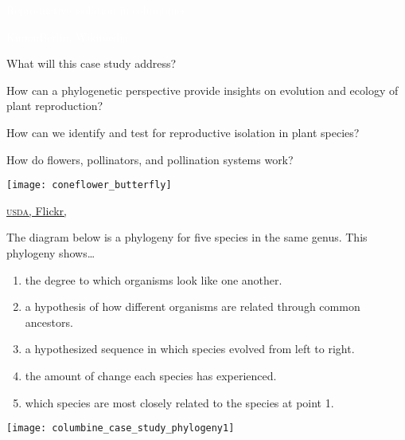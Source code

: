 \documentclass[t,handout]{beamer}  %
\newcommand{\ques}[1]{\highlight{\textsc{q#1:}}}
\begin{document}
{
\begin{frame}[t]{\textcolor{white}{Reproductive isolation in columbines.}}

\vfilll

\tiny \textcolor{white}{KimonBerlin, Wikimedia }
\end{frame}
}
%
\begin{frame}[t]{What will this case study address?}

	\begin{multicols}{2}
	\hangpara How can a phylogenetic perspective provide insights on evolution and ecology of plant reproduction?
	
	\hangpara How can we identify and test for reproductive isolation in plant species?

	\hangpara How do flowers, pollinators, and pollination systems work?

	\columnbreak
	
	\texttt{[image: coneflower\_butterfly]}
	\end{multicols}
	 
	\vfilll
	
	\hfill \tiny \href{https://www.flickr.com/photos/usdagov/12837726385/in/photolist-kyqGN6-fh8AaV-kyTDd4-i44Hma-dMyexJ-U9oNPh-8MVKpC-9iEtgR-pfUkfN-i6BB1D-WeaPsw-aqUmTV-6R2QfY-e1GG39-JdQ1fs-YNbHzz-9gp9eM-att94W-wqBjH2-ePxjLW-kyWRcE-Ydheej-8MSKyg-bfTrkF-9gsens-8FgBqc-WBMVv8-XR5juK-Kcompi-FoKX42-8Pk8CA-RLnLix-XK1ySw-pxAjzB-okRa8S-WTUtFQ-f8KyKZ-pqdijo-pbz8dh-8FjQDY-8MVKru-cEHMp7-eY8rmA-JcEdDd-f9epwz-8FgBtV-br2Mtc-WmM4uM-e5Cc3s-WeaQP9}{\textsc{usda}, Flickr, }
\end{frame}
%
\begin{frame}[t]{\ques1 The diagram below is a phylogeny for five species in the same genus. This phylogeny shows\dots}
		

	\begin{multicols}{2}
	\begin{enumerate}
		\item the degree to which organisms look like one another.
		
		\item \alert<2>{a hypothesis of how different organisms are related through common ancestors.}

		\item a hypothesized sequence in which species evolved from left to right.

		\item the amount of change each species has experienced.

		\item which species are most closely related to the species at point 1. 

	\end{enumerate}
	
	\columnbreak

		\hfill \texttt{[image: columbine\_case\_study\_phylogeny1]}
\end{multicols}
\end{frame}
\end{document}
